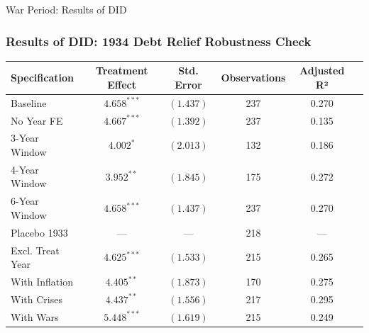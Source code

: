 \documentclass{beamer}
\begin{document}
\begin{frame}{War Period: Results of DID}
  \frametitle{Results of DID: 1934 Debt Relief Robustness Check}
  \begin{table}[ht!]\centering
      \renewcommand{\arraystretch}{1.1}
      \footnotesize
      \begin{tabular}{@{}p{2.2cm}ccccc@{}}
    \toprule
    \textbf{Specification} & \textbf{Treatment Effect} & \textbf{Std. Error} & \textbf{Observations} & \textbf{Adjusted R²} \\
    \midrule
    Baseline & $4.658^{***}$ & $(1.437)$ & 237 & 0.270 \\
    No Year FE & $4.667^{***}$ & $(1.392)$ & 237 & 0.135 \\
    3-Year Window & $4.002^{*}$ & $(2.013)$ & 132 & 0.186 \\
    4-Year Window & $3.952^{**}$ & $(1.845)$ & 175 & 0.272 \\
    6-Year Window & $4.658^{***}$ & $(1.437)$ & 237 & 0.270 \\
    Placebo 1933 & --- & --- & 218 & --- \\
    Excl. Treat Year & $4.625^{***}$ & $(1.533)$ & 215 & 0.265 \\
    With Inflation & $4.405^{**}$ & $(1.873)$ & 170 & 0.275 \\
    With Crises & $4.437^{**}$ & $(1.556)$ & 217 & 0.295 \\
    With Wars & $5.448^{***}$ & $(1.619)$ & 215 & 0.249 \\
    \bottomrule
    \end{tabular}
    \end{table}
\end{frame}
\end{document}
